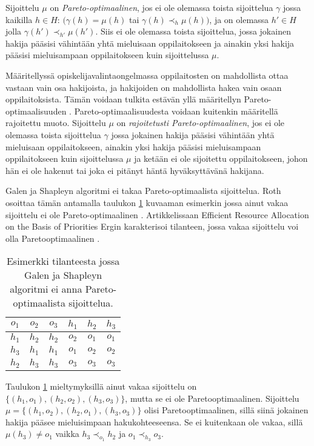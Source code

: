 \documentclass[twoside]{tktltiki}
\begin{document}
Sijoittelu $\mu$ on \emph{Pareto-optimaalinen}, jos ei ole olemassa
toista sijoittelua $\gamma$ jossa kaikilla $h \in H$: $(\gamma(h) =
\mu(h)$ tai $\gamma(h) \prec_h \mu(h))$, ja on olemassa $h' \in H$
jolla $\gamma(h') \prec_{h'} \mu(h')$. Siis ei ole olemassa toista
sijoittelua, jossa jokainen hakija pääsisi vähintään yhtä mieluisaan
oppilaitokseen ja ainakin yksi hakija pääsisi mieluisampaan
oppilaitokseen kuin sijoittelussa $\mu$.

Määritellyssä opiskelijavalintaongelmassa oppilaitosten on mahdollista
ottaa vastaan vain osa hakijoista, ja hakijoiden on mahdollista hakea
vain osaan oppilaitoksista. Tämän voidaan tulkita estävän yllä
määritellyn Pareto-optimaalisuuden \cite{kojima10}.
Pareto-optimaalisuudesta voidaan kuitenkin määritellä rajoitettu
muoto. Sijoittelu $\mu$ on \emph{rajoitetusti Pareto-optimaalinen},
jos ei ole olemassa toista sijoittelua $\gamma$ jossa jokainen hakija
pääsisi vähintään yhtä mieluisaan oppilaitokseen, ainakin yksi hakija
pääsisi mieluisampaan oppilaitokseen kuin sijoittelussa $\mu$ ja
ketään ei ole sijoitettu oppilaitokseen, johon hän ei ole hakenut tai
joka ei pitänyt häntä hyväksyttävänä hakijana.

Galen ja Shapleyn algoritmi ei takaa Pareto-optimaalista sijoittelua.
Roth osoittaa tämän antamalla taulukon \ref{roth_optimaalisuus}
kuvaaman esimerkin jossa ainut vakaa sijoittelu ei ole
Pareto-optimaalinen \cite{roth82}. Artikkelissaan Efficient Resource
Allocation on the Basis of Priorities Ergin karakterisoi tilanteen,
jossa vakaa sijoittelu voi olla Pareto\hyph optimaalinen
\cite{ergin02}.

\begin{table}[ht]
  \begin{center}
    \begin{tabular}{ c c c | c c c }
      $o_1$ & $o_2$ & $o_3$ & $h_1$ & $h_2$ & $h_3$ \\
      \hline
      $h_1$ & $h_2$ & $h_2$ & $o_2$ & $o_1$ & $o_1$ \\
      $h_3$ & $h_1$ & $h_1$ & $o_1$ & $o_2$ & $o_2$ \\
      $h_2$ & $h_3$ & $h_3$ & $o_3$ & $o_3$ & $o_3$
    \end{tabular}
    \caption{Esimerkki tilanteesta jossa Galen ja Shapleyn algoritmi
      ei anna Pareto-optimaalista sijoittelua.}
    \label{roth_optimaalisuus}
  \end{center}
\end{table}

Taulukon \ref{roth_optimaalisuus} mieltymyksillä ainut vakaa
sijoittelu on $\{(h_1, o_1), (h_2, o_2), (h_3, o_3)\}$, mutta se ei
ole Pareto\hyph optimaalinen. Sijoittelu $\mu = \{(h_1, o_2), (h_2,
o_1), (h_3, o_3)\}$ olisi Pareto\hyph optimaalinen, sillä siinä
jokainen hakija pääsee mieluisimpaan hakukohteeseensa. Se ei
kuitenkaan ole vakaa, sillä $\mu(h_3) \neq o_1$ vaikka $h_3
\prec_{o_1} h_2$ ja $o_1 \prec_{h_3} o_3$.
\end{document}
